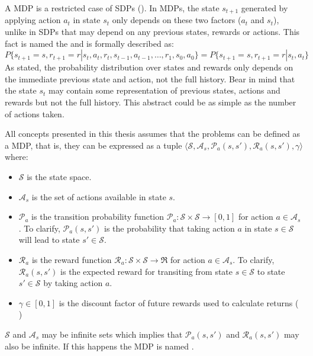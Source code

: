 A \acf{MDP} is a restricted case of \acp{SDP} (\cite[Section~3.5]{sutton1998introduction}). In \acp{MDP}, the state $s_{t+1}$
generated by applying action $a_t$ in state $s_t$ only depends on these two factors ($a_t$ and $s_t$), unlike in \acp{SDP} that may depend
on any previous states, rewards or actions. This fact is named the  and is formally described as:
\begin{equation}
    P \lbrace s_{t+1} = s, r_{t+1} = r | s_t,a_t,r_t,s_{t-1},a_{t-1}, \dots, r_1, s_0, a_0 \rbrace =
    P \lbrace s_{t+1} = s, r_{t+1} = r | s_t,a_t \rbrace
\end{equation}
As stated, the probability distribution over states and rewards only depends on the immediate previous state and action, not the full history. Bear in mind that the state $s_t$ may contain some representation of previous states, actions and rewards but not the full history. This abstract could be as simple as the number of actions taken.

All concepts presented in this thesis assumes that the problems can be defined as a MDP, that is,
they can be expressed as a tuple $\langle\mathcal{S}, \mathcal{A}_s,
\mathcal{P}_a(s,s'), \mathcal{R}_a(s,s'), \gamma \rangle$ where:
\begin{itemize}
    \item $\mathcal{S}$ is the state space.
    \item $\mathcal{A}_s$ is the set of actions available in state $s$.
    \item $\mathcal{P}_a$ is the transition probability function
    $\mathcal{P}_a : \mathcal{S} \times \mathcal{S} \rightarrow [0,1]$
    for action $a \in \mathcal{A}_s$ . To clarify, $\mathcal{P}_a(s,s')$
    is the probability that taking action $a$ in state $s \in \mathcal{S}$ will lead
    to state $s' \in \mathcal{S}$.
    \item $\mathcal{R}_a$ is the reward function
    $\mathcal{R}_a : \mathcal{S} \times \mathcal{S} \rightarrow \Re$ for action
    $a \in \mathcal{A}_s$. To clarify, $\mathcal{R}_a(s,s')$ is the expected
    reward for transiting from state $s \in \mathcal{S}$ to state $s' \in \mathcal{S}$
    by taking action $a$.
    \item $\gamma \in [0,1]$ is the discount factor of future rewards used to calculate returns (  )
\end{itemize}

$\mathcal{S}$ and $\mathcal{A}_s$ may be infinite sets which implies that $\mathcal{P}_a(s,s')$ and $\mathcal{R}_a(s,s')$ may
also be infinite. If this happens the MDP is named .

